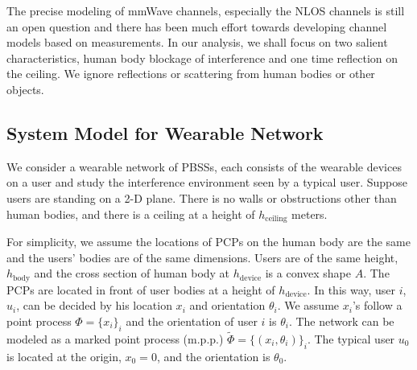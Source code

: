 \documentclass[10pt, conference, letterpaper]{IEEEtran}
\begin{document}
The precise modeling of mmWave channels, especially the NLOS channels is still an open question and there has been much effort towards developing channel models based on measurements. In our analysis, we shall focus on two salient characteristics, human body blockage of interference and one time reflection on the ceiling. We ignore reflections or scattering from human bodies or other objects.

\subsection{System Model for Wearable Network}
We consider a wearable network of PBSSs, each consists of the wearable devices on a user and study the interference environment seen by a typical user. Suppose users are standing on a 2-D plane. There is no walls or obstructions other than human bodies, and there is a ceiling at a height of $h_{\mathrm{ceiling}}$ meters. 

For simplicity, we assume the locations of PCPs on the human body are the same and the users' bodies are of the same dimensions. Users are of the same height, $h_{\mathrm{body}}$ and the cross section of human body at $h_{\mathrm{device}}$ is a convex shape $A$. The PCPs are located in front of user bodies at a height of $h_{\mathrm{device}}$. In this way, user $i$, $u_i$, can be decided by his location $x_i$ and orientation $\theta_i$. We assume $x_i$'s follow a point process $\Phi=\{x_i\}_i$ and the orientation of user $i$ is $\theta_i$. The network can be modeled as a marked point process (m.p.p.) $\tilde{\Phi}=\{(x_i, \theta_i)\}_i$. The typical user $u_0$ is located at the origin, $x_0=0$, and the orientation is $\theta_0$.
\end{document}
